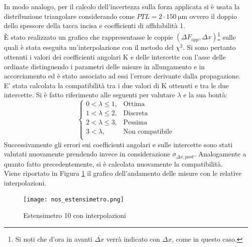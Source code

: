 \documentclass[a4paper,11pt,oneside]{article}
\begin{document}
In modo analogo, per il calcolo dell'incertezza sulla forza applicata si è usata la distribuzione triangolare considerando come $PTL=2 \cdot \SI{150}{\micro\meter}$ ovvero  il doppio dello spessore della tacca incisa e coefficienti di affidabilità 1.\\
È stato realizzato un grafico che rappresentasse le coppie $(\Delta F_{app}, \Delta x)$\footnote{Si noti che d'ora in avanti $\overline{\Delta x}$ verrà indicato con $\Delta x$, come in questo caso.} sulle quali è stata eseguita un'interpolazione con il metodo del $\chi^2$.
Si sono pertanto ottenuti i valori dei coefficienti angolari K e delle intercette con l'asse delle ordinate distinguendo i parametri delle misure in allungamento e in accorciamento ed è stato associato ad essi l'errore derivante dalla propagazione.\\
E' stata calcolata la compatibilità tra i due valori di K ottenuti e tra le due intercette. Si è fatto riferimento alle seguenti per valutare $\lambda$ e la sua bontà:
\begin{equation*}%
    \label{eq:cases}
    \begin{cases}
    0<\lambda\leq 1, & \text{Ottima}\\
    1<\lambda\leq2, & \text{Discreta}\\
    2<\lambda\leq3, & \text{Pessima}\\
    3<\lambda, & \text{Non compatibile}\\
    \end{cases}
\end{equation*}
Successivamente gli errori sui coefficienti angolari e sulle intercette sono stati valutati nuovamente prendendo invece in considerazione $\sigma_{\Delta x, post}$. Analogamente a quanto fatto precedentemente, si è calcolata nuovamente la compatibilità.\\
Viene riportato in Figura \ref{fig:nos_estensimetro.png} il grafico dell'andamento delle misure con le relative interpolazioni.

\begin{figure}[h!]
    \centering
        \caption{Estensimetro 10 con interpolazioni}
        \label{fig:nos_estensimetro.png}
        \texttt{[image: nos\_estensimetro.png]}
\end{figure}
\end{document}
